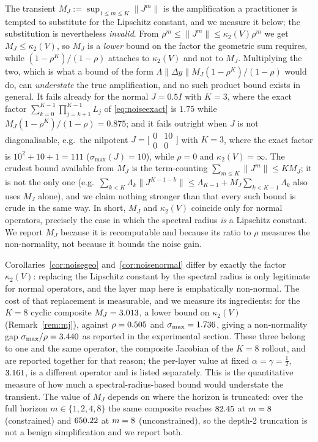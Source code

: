 \documentclass[journal,cmes,article,submit,moreauthors,pdftex]{Definitions/tsp}
\newcommand{\norm}[1]{\lVert #1 \rVert}
\newcommand{\numv}[1]{#1}
\begin{document}
\begin{Remark}\label{rem:mj}
The transient $M_J:=\sup_{1\le m\le K}\norm{J^{m}}$ is the amplification a practitioner is tempted
to substitute for the Lipschitz constant, and we measure it below; the substitution is nevertheless
\emph{invalid}. From $\rho^{m}\le\norm{J^{m}}\le\kappa_2(V)\rho^{m}$ we get $M_J\le\kappa_2(V)$, so
$M_J$ is a \emph{lower} bound on the factor the geometric sum requires, while
$(1-\rho^{K})/(1-\rho)$ attaches to $\kappa_2(V)$ and not to $M_J$. Multiplying the two, which is
what a bound of the form $\Lambda\norm{\Delta y}M_J(1-\rho^{K})/(1-\rho)$ would do, can
\emph{understate} the true amplification, and no such product bound exists in general. It fails
already for the normal $J=0.5I$ with $K=3$, where the exact factor
$\sum_{k=0}^{K-1}\prod_{j=k+1}^{K-1}L_j$ of \eqref{eq:noiseexact} is $1.75$ while
$M_J(1-\rho^{K})/(1-\rho)=0.875$; and it fails outright when $J$ is not diagonalisable, e.g.\ the
nilpotent $J=\bigl[\begin{smallmatrix}0&10\\0&0\end{smallmatrix}\bigr]$ with $K=3$, where the exact
factor is $10^2+10+1=111$ ($\sigma_{\max}(J)=10$), while $\rho=0$ and $\kappa_2(V)=\infty$. The crudest bound available from $M_J$ is the
term-counting $\sum_{m\le K}\norm{J^{m}}\le K M_J$; it is not the only one (e.g.\
$\sum_{k<K}\Lambda_k\norm{J^{K-1-k}}\le\Lambda_{K-1}+M_J\sum_{k<K-1}\Lambda_k$ also uses $M_J$
alone), and we claim nothing stronger than that every such bound is crude in the same way. In short, $M_J$ and
$\kappa_2(V)$ coincide only for normal operators, precisely the case in which the spectral radius
\emph{is} a Lipschitz constant. We report $M_J$ because it is recomputable and because its ratio to
$\rho$ measures the non-normality, not because it bounds the noise gain.
\end{Remark}
Corollaries~\ref{cor:noisegeo} and~\ref{cor:noisenormal} differ by exactly the factor $\kappa_2(V)$:
replacing the Lipschitz constant by the spectral radius is only legitimate for normal
operators, and the layer map here is emphatically non-normal. The cost of that replacement is
measurable, and we measure its ingredients: for the $K{=}8$ cyclic composite
$M_J=\numv{\NumMJCons}$, a lower bound on $\kappa_2(V)$ (Remark~\ref{rem:mj}), against
$\rho=\numv{\NumRhoComp}$ and $\sigma_{\max}=\numv{\NumSigCompCons}$, giving a non-normality gap
$\sigma_{\max}/\rho=\numv{\NumGapRatio}$ as reported in the experimental section. These three belong to one and
the same operator, the composite Jacobian of the $K{=}8$ rollout, and are reported
together for that reason; the per-layer value at fixed $\alpha=\gamma=\tfrac12$,
$\numv{\NumSigCompLayerCons}$, is a different operator and is listed separately. This is the quantitative measure of
how much a spectral-radius-based bound would understate the transient. The value of $M_J$ depends on
where the horizon is truncated: over the full horizon $m\in\{1,2,4,8\}$ the same composite reaches
$\numv{\NumMJFullCons}$ at $m=\numv{\NumMJFullArgmaxM}$ (constrained) and $\numv{\NumMJFullUnc}$ at
$m=\numv{\NumMJFullArgmaxMUnc}$ (unconstrained), so the depth-2 truncation is not a benign
simplification and we report both.
\end{document}
